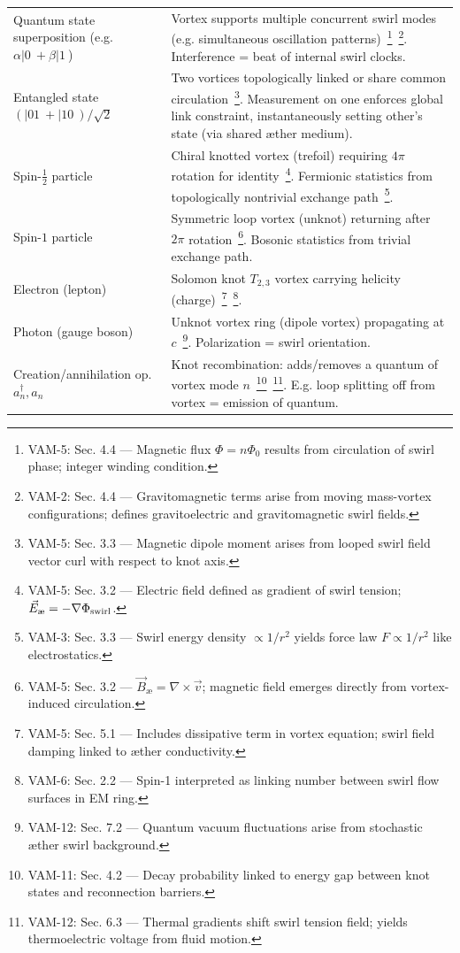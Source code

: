 \documentclass[a4paper,12pt]{article}
\begin{document}
\begin{table}[H]
\begin{tabular}{p{} | p{}}
            Quantum state superposition (e.g. $\alpha|0\>+\beta|1\>$) & Vortex supports multiple concurrent swirl modes (e.g. simultaneous oscillation patterns)~\footnote{VAM-5: Sec. 4.4 — Magnetic flux $\Phi = n\Phi_0$ results from circulation of swirl phase; integer winding condition.}~\footnote{VAM-2: Sec. 4.4 — Gravitomagnetic terms arise from moving mass-vortex configurations; defines gravitoelectric and gravitomagnetic swirl fields.}. Interference = beat of internal swirl clocks. \\
            Entangled state $(|01\>+|10\>)/\sqrt{2}$ & Two vortices topologically linked or share common circulation~\footnote{VAM-5: Sec. 3.3 — Magnetic dipole moment arises from looped swirl field vector curl with respect to knot axis.}. Measurement on one enforces global link constraint, instantaneously setting other’s state (via shared æther medium). \\
            Spin-$\frac{1}{2}$ particle & Chiral knotted vortex (trefoil) requiring $4\pi$ rotation for identity~\footnote{VAM-5: Sec. 3.2 — Electric field defined as gradient of swirl tension; $\vec{E}_{\text{\ae}} = -\nabla \Phi_{\rm swirl}$.}. Fermionic statistics from topologically nontrivial exchange path~\footnote{VAM-3: Sec. 3.3 — Swirl energy density $\propto 1/r^2$ yields force law $F \propto 1/r^2$ like electrostatics.}. \\
            Spin-$1$ particle & Symmetric loop vortex (unknot) returning after $2\pi$ rotation~\footnote{VAM-5: Sec. 3.2 — $\vec{B}_{\text{\ae}} = \nabla \times \vec{v}$; magnetic field emerges directly from vortex-induced circulation.}. Bosonic statistics from trivial exchange path. \\
            Electron (lepton) & Solomon knot $T_{2,3}$ vortex carrying helicity (charge)~\footnote{VAM-5: Sec. 5.1 — Includes dissipative term in vortex equation; swirl field damping linked to æther conductivity.}~\footnote{VAM-6: Sec. 2.2 — Spin-1 interpreted as linking number between swirl flow surfaces in EM ring.}. \\
            Photon (gauge boson) & Unknot vortex ring (dipole vortex) propagating at $c$~\footnote{VAM-12: Sec. 7.2 — Quantum vacuum fluctuations arise from stochastic æther swirl background.}. Polarization = swirl orientation. \\
            Creation/annihilation op. $a_n^\dagger, a_n$ & Knot recombination: adds/removes a quantum of vortex mode $n$~\footnote{VAM-11: Sec. 4.2 — Decay probability linked to energy gap between knot states and reconnection barriers.}~\footnote{VAM-12: Sec. 6.3 — Thermal gradients shift swirl tension field; yields thermoelectric voltage from fluid motion.}. E.g. loop splitting off from vortex = emission of quantum. \\

\end{tabular}
\end{table}
\end{document}
